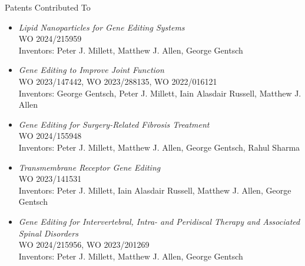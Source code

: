\documentclass{resume} %
\begin{document}
\begin{rSection}{Patents Contributed To}
\begin{itemize}


\item \textit{Lipid Nanoparticles for Gene Editing Systems}\\WO 2024/215959\\Inventors: Peter J. Millett, Matthew J. Allen, George Gentsch

\item \textit{Gene Editing to Improve Joint Function}\\WO 2023/147442, WO 2023/288135, WO 2022/016121 \\Inventors: George Gentsch, Peter J. Millett, Iain Alasdair Russell, Matthew J. Allen

\item \textit{Gene Editing for Surgery-Related Fibrosis Treatment}\\WO 2024/155948\\Inventors: Peter J. Millett, Matthew J. Allen, George Gentsch, Rahul Sharma

\item \textit{Transmembrane Receptor Gene Editing}\\WO 2023/141531\\Inventors: Peter J. Millett, Iain Alasdair Russell, Matthew J. Allen, George Gentsch

\item \textit{Gene Editing for Intervertebral, Intra- and Peridiscal Therapy and Associated Spinal Disorders}\\WO 2024/215956, WO 2023/201269 \\Inventors: Peter J. Millett, Matthew J. Allen, George Gentsch
\end{itemize}

\end{rSection}
\end{document}
